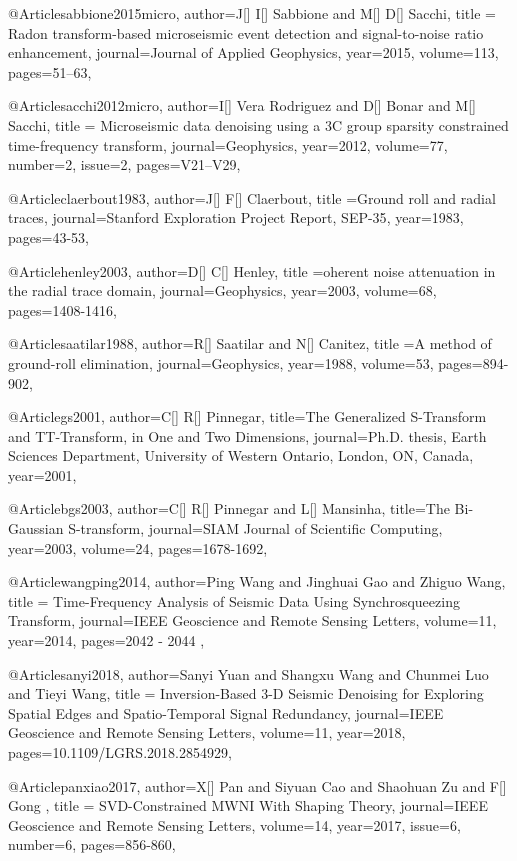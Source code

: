 @Article{sabbione2015micro,
  author={J[] I[] Sabbione and M[] D[] Sacchi},
  title = {Radon transform-based microseismic event detection and signal-to-noise ratio enhancement},
  journal={Journal of Applied Geophysics},
  year=2015,
volume=113,
  pages={51–63},
}

@Article{sacchi2012micro,
  author={I[] Vera Rodriguez and D[] Bonar and M[] Sacchi},
  title = {Microseismic data denoising using a 3C group sparsity constrained time-frequency transform},
  journal={Geophysics},
  year=2012,
volume=77,
number=2,
issue=2,
  pages={V21–V29},
}

@Article{claerbout1983,
  author={J[] F[] Claerbout},
  title ={Ground roll and radial traces},
  journal={Stanford Exploration Project Report, SEP-35},
  year=1983,
  pages={43-53},
}

@Article{henley2003,
  author={D[] C[] Henley},
  title ={oherent noise attenuation in the radial trace domain},
  journal={Geophysics},
  year=2003,
  volume=68,
  pages={1408-1416},
}

@Article{saatilar1988,
  author={R[] Saatilar and N[] Canitez},
  title ={A method of ground-roll elimination},
  journal={Geophysics},
  year=1988,
  volume=53,
  pages={894-902},
}

@Article{gs2001,
  author={C[] R[] Pinnegar},
  title={The Generalized S-Transform and TT-Transform, in One and Two Dimensions},
  journal={Ph.D. thesis, Earth Sciences Department, University of Western Ontario, London,
ON, Canada},
  year=2001,
}

@Article{bgs2003,
  author={C[] R[] Pinnegar and L[] Mansinha},
  title={The {B}i-{G}aussian {S}-transform},
  journal={SIAM Journal of Scientific Computing},
  year=2003,
  volume=24,
  pages={1678-1692},
}

@Article{wangping2014,
  author={Ping Wang and Jinghuai Gao and Zhiguo Wang},
  title = {Time-Frequency Analysis of Seismic Data Using Synchrosqueezing Transform},
  journal={IEEE Geoscience and Remote Sensing Letters},
  volume={11},
  year=2014,
  pages={2042 - 2044 },
}

@Article{sanyi2018,
  author={Sanyi Yuan and Shangxu Wang and Chunmei Luo and Tieyi Wang},
  title = {Inversion-Based 3-D Seismic Denoising for Exploring Spatial Edges and Spatio-Temporal Signal Redundancy},
  journal={IEEE Geoscience and Remote Sensing Letters},
  volume={11},
  year=2018,
  pages={10.1109/LGRS.2018.2854929},
}



@Article{panxiao2017,
  author={X[] Pan and Siyuan Cao and Shaohuan Zu and F[] Gong },
  title = {SVD-Constrained MWNI With Shaping Theory},
  journal={IEEE Geoscience and Remote Sensing Letters},
  volume={14},
  year=2017,
  issue=6,
  number=6,
  pages={856-860},
}

